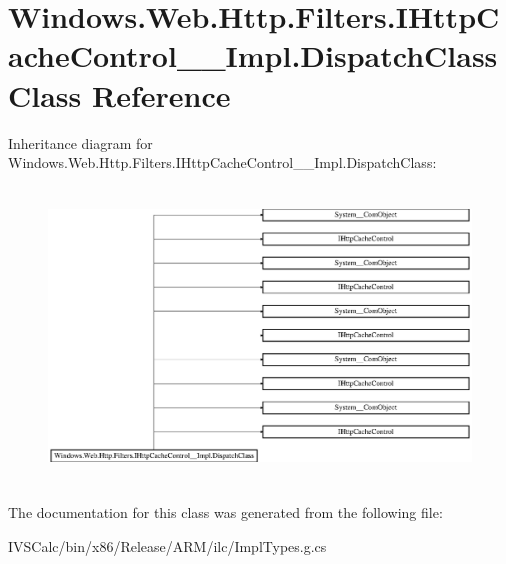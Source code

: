 \hypertarget{class_windows_1_1_web_1_1_http_1_1_filters_1_1_i_http_cache_control_____impl_1_1_dispatch_class}{}\section{Windows.\+Web.\+Http.\+Filters.\+I\+Http\+Cache\+Control\+\_\+\+\_\+\+Impl.\+Dispatch\+Class Class Reference}
\label{class_windows_1_1_web_1_1_http_1_1_filters_1_1_i_http_cache_control_____impl_1_1_dispatch_class}
Inheritance diagram for Windows.\+Web.\+Http.\+Filters.\+I\+Http\+Cache\+Control\+\_\+\+\_\+\+Impl.\+Dispatch\+Class\+:\begin{figure}[H]
\begin{center}
\leavevmode
\includegraphics[height=7.877238cm]{class_windows_1_1_web_1_1_http_1_1_filters_1_1_i_http_cache_control_____impl_1_1_dispatch_class}
\end{center}
\end{figure}


The documentation for this class was generated from the following file\+:\begin{DoxyCompactItemize}
\item 
I\+V\+S\+Calc/bin/x86/\+Release/\+A\+R\+M/ilc/Impl\+Types.\+g.\+cs\end{DoxyCompactItemize}
